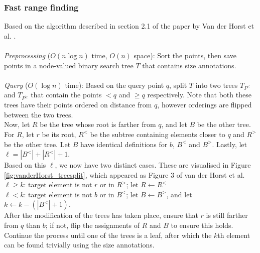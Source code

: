 \documentclass{article}
\newcommand{\fb}[1]{{#1}}
\begin{document}
\subsubsection{Fast range finding}
Based on the algorithm described in section 2.1 of the paper by Van der Horst
et al. \cite{vanderhorst_et_al:LIPIcs.ESA.2022.67}. \\\\ 
\textit{Preprocessing} ($O(n \log n)$ time, $O(n)$ space): Sort the points, then save
points in a node-valued binary search tree $T$ that contains size annotations.
\\\\ \textit{Query} ($O(\log n)$ time): Based on the query point $q$, split $T$ into two trees
$T_{P^<}$ and $T_{P^{\geq}}$ that contain the points $< q$ and $\geq q$
respectively. Note that both these trees have their points ordered on distance
from $q$, however orderings are flipped between the two trees. \\ Now, let $R$
be the tree whose root is farther from $q$, and let $B$ be the other tree. For
$R$, let $r$ be its root, $R^<$ be the subtree containing elements closer to
$q$ and $R^>$ be the other tree. Let $B$ have identical definitions for $b$,
$B^<$ and $B^>$. Lastly, let $\ell = |B^<| + |R^<| + 1$. \\ Based on this
$\ell$, we now have two distinct cases. \fb{These are visualised in Figure \ref{fig:vanderHorst_treesplit}, which appeared as Figure 3 of van der Horst et al.} \\ 
$\ell \geq k$: target element is
not $r$ or in $R^>$; let $R \leftarrow R^<$\\ $\ell < k$: target element is not
$b$ or in $B^<$; let $B \leftarrow B^>$, and let $k \leftarrow k - (|B^<| +
    1)$. \\ After the modification of the trees has taken place, ensure that $r$ is
still farther from $q$ than $b$; if not, flip the assignments of $R$ and $B$ to
ensure this holds. Continue the process until one of the trees is a leaf, after
which the $k$th element can be found trivially using the size annotations.
\end{document}
